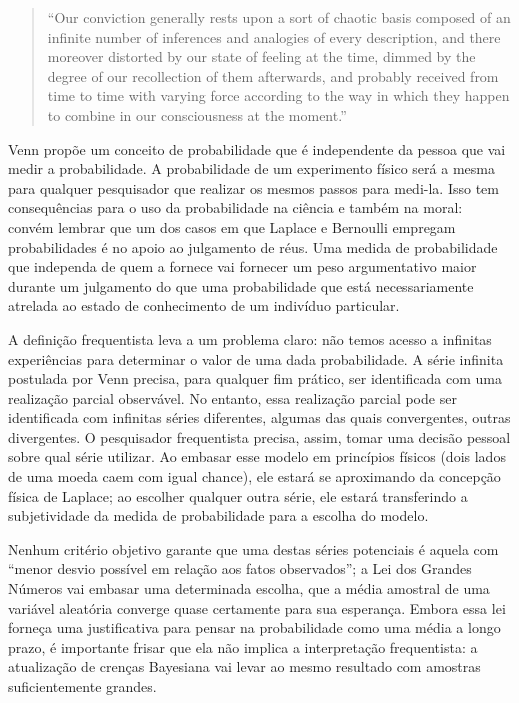 \begin{quote}
``Our conviction generally rests upon a sort of chaotic basis
composed of an infinite number of inferences and analogies
of every description, and there moreover distorted by our
state of feeling at the time, dimmed by the degree of our
recollection of them afterwards, and probably received
from time to time with varying force according to the way in
which they happen to combine in our consciousness at the 
moment.''\citep{Venn1866}
\end{quote}

Venn propõe um conceito de probabilidade que é independente da pessoa que vai medir a probabilidade. A probabilidade
de um experimento físico será a mesma para qualquer pesquisador que realizar os mesmos passos para medi-la. Isso
tem consequências para o uso da probabilidade na ciência e também na moral: convém lembrar que um dos casos em que Laplace e
Bernoulli empregam probabilidades é no apoio ao julgamento de réus. Uma medida de probabilidade que independa de quem
a fornece vai fornecer um peso argumentativo maior durante um julgamento do que uma probabilidade que está necessariamente
atrelada ao estado de conhecimento de um indivíduo particular.

A definição frequentista leva a um problema claro: não temos acesso a infinitas experiências para
determinar o valor de uma dada probabilidade. A série infinita postulada por Venn precisa, para
qualquer fim prático, ser identificada com uma realização parcial observável. No entanto,
essa realização parcial pode ser identificada com infinitas séries diferentes, algumas das quais convergentes,
outras divergentes. O pesquisador frequentista precisa, assim, tomar uma decisão pessoal sobre
qual série utilizar. Ao embasar esse modelo em princípios físicos (dois lados de uma moeda caem com igual chance),
ele estará se aproximando da concepção física de Laplace; ao escolher qualquer outra série, ele estará
transferindo a subjetividade da medida de probabilidade para a escolha do modelo.

Nenhum critério objetivo garante que uma destas séries potenciais é aquela com ``menor desvio possível
em relação aos fatos observados''; a Lei dos Grandes Números \citep{Loeve77} vai embasar uma determinada escolha,
que a média amostral de uma variável aleatória converge quase certamente para sua esperança. 
Embora essa lei forneça uma
justificativa para pensar na probabilidade como uma média a longo prazo, é importante frisar que ela não implica a
interpretação frequentista: a atualização de crenças Bayesiana vai levar ao mesmo resultado com amostras suficientemente
grandes.

